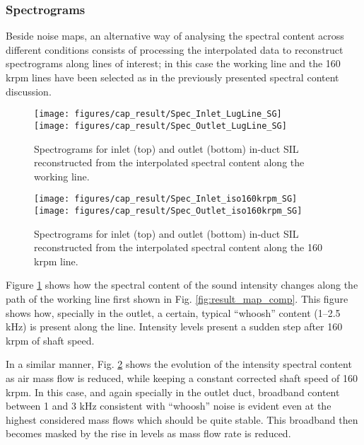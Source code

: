\subsubsection{Spectrograms}

Beside noise maps, an alternative way of analysing the spectral content across different conditions consists of processing the interpolated data to reconstruct spectrograms along lines of interest; in this case the working line and the 160 krpm lines have been selected as in the previously presented spectral content discussion.

\begin{figure}[tbh!]
\centering
\texttt{[image: figures/cap\_result/Spec\_Inlet\_LugLine\_SG]}\\[5mm]
\texttt{[image: figures/cap\_result/Spec\_Outlet\_LugLine\_SG]}
\caption{Spectrograms for inlet (top) and outlet (bottom) in-duct SIL reconstructed from the interpolated spectral content along the working line.}
\label{fig:result_LugLine_SG}
\end{figure}

\begin{figure}[tbh!]
\centering
\texttt{[image: figures/cap\_result/Spec\_Inlet\_iso160krpm\_SG]}\vspace{5mm}
\texttt{[image: figures/cap\_result/Spec\_Outlet\_iso160krpm\_SG]}
\caption{Spectrograms for inlet (top) and outlet (bottom) in-duct SIL reconstructed from the interpolated spectral content along the 160 krpm line.}
\label{fig:result_iso160krpm_SG}
\end{figure}

Figure \ref{fig:result_LugLine_SG} shows how the spectral content of the sound intensity changes along the path of the working line first shown in Fig. \ref{fig:result_map_comp}. This figure shows how, specially in the outlet, a certain, typical ``whoosh'' content (1--2.5 kHz) is present along the line. Intensity levels present a sudden step after 160 krpm of shaft speed.

In a similar manner, Fig. \ref{fig:result_iso160krpm_SG} shows the evolution of the intensity spectral content as air mass flow is reduced, while keeping a constant corrected shaft speed of 160 krpm. In this case, and again specially in the outlet duct, broadband content between 1 and 3 kHz consistent with ``whoosh'' noise is evident even at the highest considered mass flows which should be quite stable. This broadband then becomes masked by the rise in levels as mass flow rate is reduced.

